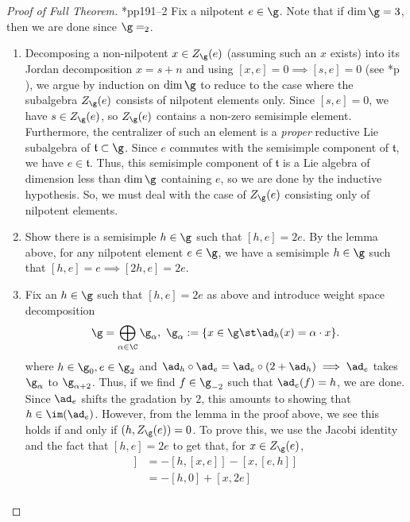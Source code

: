 \documentclass[springer-theory-notes.tex]{subfiles}
\begin{document}
\begin{proof}[Proof of Full Theorem]
  \cite{cg}*{pp191--2} Fix a nilpotent \(e \in \g\). Note that if
  \(\dim \g = 3\), then we 
  are done since \(\g = \sl_2\).
  \begin{enumerate}[label=(\arabic*)]
  \item Decomposing a non-nilpotent \(x \in Z_\g(e)\) (assuming such
    an \(x\) exists) into its Jordan
    decomposition \(x = s+n\) and using \([x,e] = 0 \implies
    [s,e]=0\) (see \cite{humph}*{p } ), we argue by induction on \(\dim
    \g\) to reduce to the case where 
    the subalgebra \(Z_\g(e)\) consists of nilpotent elements
    only. Since \([s,e] = 0\), we have \(s \in Z_\g(e)\), so
    \(Z_\g(e)\) contains a non-zero semisimple element. Furthermore,
    the centralizer of such an element is a \emph{proper} reductive
    Lie subalgebra of \(\mathfrak{t} \subset \g\). Since \(e\) commutes
    with the semisimple component of \(\mathfrak{t}\), we have \(e \in
    \mathfrak{t}\). Thus, this semisimple component of
    \(\mathfrak{t}\) is a Lie algebra of dimension less than \(\dim
    \g\) containing \(e\), so we are done by the inductive
    hypothesis. So, we must deal with the case of \(Z_\g(e)\)
    consisting only of nilpotent elements.
  \item Show there is a semisimple \(h \in \g\) such that \([h,e]=2e\). By the
    lemma above, for any nilpotent element \(e \in \g\), we have
    a semisimple \(h \in \g\) such that \([h,e] = e \implies [2h,e] = 2e\).
  \item Fix an \(h \in \g\) such that \([h,e]=2e\) as above and introduce
    weight space decomposition \[
      \g = \bigoplus_{\alpha \in \C} \g_\alpha, \ \g_\alpha := \{x \in
      \g \st \ad_h(x) = \alpha \cdot x\}.
    \]
    where \(h \in \g_0, e \in \g_2\) and \(\ad_h \circ \ad_e = \ad_e
    \circ (2+ \ad_h) \implies \ad_e\) takes \(\g_\alpha\) to
    \(\g_{\alpha+2}\). Thus, if we find \(f \in \g_{-2}\) such that
    \(\ad_e(f) = h\), we are done. Since \(\ad_e\) shifts the
    gradation by \(2\), this amounts to showing that \(h \in
    \im(\ad_e)\). However, from the
    lemma in the proof above, we see this holds if and only if
    \((h,Z_\g(e)) = 0\). To prove this, we use the Jacobi identity and
    the fact that \([h,e]=2e\) to get that, for \(x \in Z_\g(e)\),
    \begin{align*}
      [e,[h,x]] & = -[h,[x,e]]-[x,[e,h]] \\
                & = -[h,0] + [x,2e] \\

\end{align*}
\end{enumerate}
\end{proof}
\end{document}
